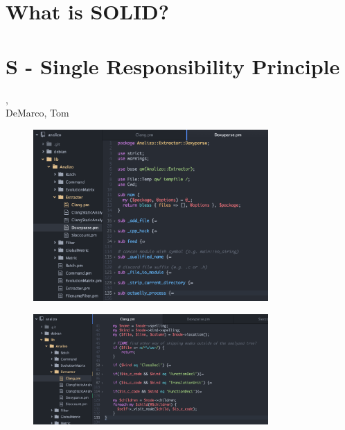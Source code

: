 \section{What is SOLID?} %
\label{sec:what_is_solid_}


\section{S - Single Responsibility Principle } %
\label{sec:s}

\begin{frame}
	, \\DeMarco, Tom
\end{frame}

\begin{frame}
  \begin{figure}[p]
        \centering
        \includegraphics[width=0.8\textwidth]{doxyparse_pattern.png}
        \label{fig:Pattern}
    \end{figure}
\end{frame}

\begin{frame}
  \begin{figure}[p]
        \centering
        \includegraphics[width=0.8\textwidth]{clang_antipattern.png}
        \label{fig:antiPattern}
    \end{figure}
\end{frame}

